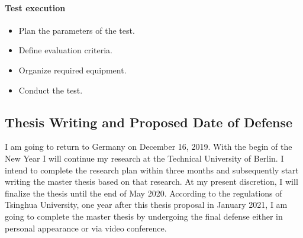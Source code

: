 \paragraph{Test execution}
\begin{itemize}
    \item Plan the parameters of the test.
    \item Define evaluation criteria.
    \item Organize required equipment.
    \item Conduct the test.
\end{itemize}



\subsection{Thesis Writing and Proposed Date of Defense}

I am going to return to Germany on December 16, 2019.
With the begin of the New Year I will continue my research at the Technical University of Berlin.
I intend to complete the research plan within three months
and subsequently start writing the master thesis based on that research.
At my present discretion, I will finalize the thesis until the end of May 2020.
According to the regulations of Tsinghua University,
one year after this thesis proposal in January 2021, I am going to complete the master thesis
by undergoing the final defense either in personal appearance or via video conference.


